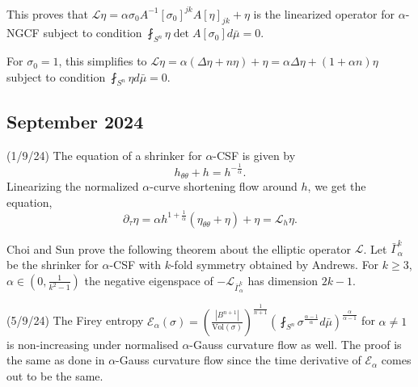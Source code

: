 \documentclass[12pt,a4paper]{article}
\begin{document}
This proves that $ \mathcal{L} \eta = \alpha \sigma_{0}A^{-1}[\sigma_{0}]^{jk}A[\eta]_{jk} + \eta $ is the linearized operator for $ \alpha $-NGCF subject to condition $ \fint_{S^{n}} \eta \det A[\sigma_{0}] d \bar{\mu} = 0 $. 

For $ \sigma_{0} = 1 $, this simplifies to $ \mathcal{L} \eta = \alpha(\Delta \eta + n \eta) + \eta  = \alpha \Delta \eta + ( 1+ \alpha n) \eta$ subject to condition $ \fint_{S^{n}} \eta d \bar{\mu}= 0 $.

\subsection*{September 2024}

\quad (1/9/24) The equation of a shrinker for $ \alpha $-CSF is given by 
\[ h_{\theta \theta} + h = h^{-\frac{1}{\alpha}}. \]
Linearizing the normalized $ \alpha $-curve shortening flow around $ h $, we get the equation, 
\[ \partial_{\tau} \eta = \alpha h^{1+ \frac{1}{\alpha}} (\eta_{\theta \theta}+ \eta)+ \eta = \mathcal{L}_{h} \eta. \]

Choi and Sun prove the following theorem about the elliptic operator $ \mathcal{L} $. Let $ \bar{\Gamma}^{k}_{\alpha} $ be the shrinker for $ \alpha $-CSF with $ k $-fold symmetry obtained by Andrews. For $ k \ge 3 $, $ \alpha \in (0, \frac{1}{k^{2}-1}) $ the negative eigenspace of $ -\mathcal{L}_{\bar{\Gamma}^{k}_{\alpha}} $ has dimension $ 2k-1 $.

(5/9/24) The Firey entropy $ \mathcal{E}_{\alpha}(\sigma) = \left( \frac{|B^{n+1}|}{\text{Vol}(\sigma)}\right)^{ \frac{1}{n+1}} \left( \fint_{S^{n}}\sigma^{ \frac{\alpha-1}{\alpha}}d \bar{\mu} \right)^{ \frac{\alpha}{\alpha-1}} $ for $ \alpha \neq 1 $ is non-increasing under normalised $ \alpha $-Gauss curvature flow as well. The proof is the same as done in $ \alpha $-Gauss curvature flow since the time derivative of $ \mathcal{E}_{\alpha} $ comes out to be the same. 
\end{document}
